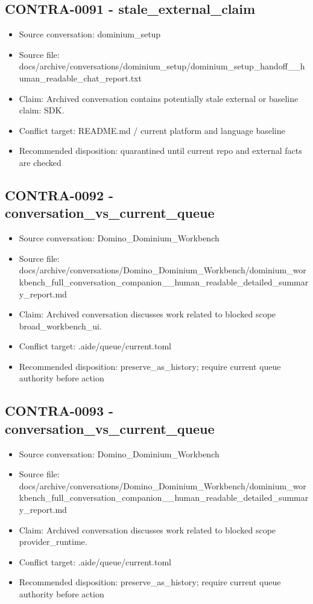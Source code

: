 \documentclass[11pt,a4paper]{report}
\begin{document}
\subsection{CONTRA-0091 - stale\_external\_claim}

\begin{itemize}
\item Source conversation: dominium\_setup
\item Source file: docs/archive/conversations/dominium\_setup/dominium\_setup\_handoff\_\_human\_readable\_chat\_report.txt
\item Claim: Archived conversation contains potentially stale external or baseline claim: SDK.
\item Conflict target: README.md / current platform and language baseline
\item Recommended disposition: quarantined until current repo and external facts are checked
\end{itemize}

\subsection{CONTRA-0092 - conversation\_vs\_current\_queue}

\begin{itemize}
\item Source conversation: Domino\_Dominium\_Workbench
\item Source file: docs/archive/conversations/Domino\_Dominium\_Workbench/dominium\_workbench\_full\_conversation\_companion\_\_human\_readable\_detailed\_summary\_report.md
\item Claim: Archived conversation discusses work related to blocked scope broad\_workbench\_ui.
\item Conflict target: .aide/queue/current.toml
\item Recommended disposition: preserve\_as\_history; require current queue authority before action
\end{itemize}

\subsection{CONTRA-0093 - conversation\_vs\_current\_queue}

\begin{itemize}
\item Source conversation: Domino\_Dominium\_Workbench
\item Source file: docs/archive/conversations/Domino\_Dominium\_Workbench/dominium\_workbench\_full\_conversation\_companion\_\_human\_readable\_detailed\_summary\_report.md
\item Claim: Archived conversation discusses work related to blocked scope provider\_runtime.
\item Conflict target: .aide/queue/current.toml
\item Recommended disposition: preserve\_as\_history; require current queue authority before action
\end{itemize}
\end{document}
